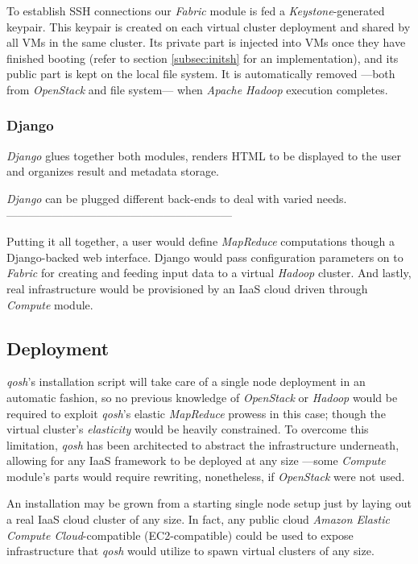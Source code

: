 \documentclass{sig-alternate}
\begin{document}
To establish SSH connections our \emph{Fabric} module is fed a \emph{Keystone}-generated keypair. This keypair is created on each virtual cluster deployment and shared by all VMs in the same cluster. Its private part is injected into VMs once they have finished booting (refer to section \ref{subsec:initsh} for an implementation), and its public part is kept on the local file system. It is automatically removed ---both from \emph{OpenStack} and file system--- when \emph{Apache Hadoop} execution completes.


\subsubsection{Django}
\noindent \emph{Django} glues together both modules, renders HTML to be displayed to the user and organizes result and metadata storage.

\emph{Django} can be plugged different back-ends to deal with varied needs. ------------------------------------------------------------

Putting it all together, a user would define \emph{MapReduce} computations though a Django-backed web interface. Django would pass configuration parameters on to \emph{Fabric} for creating and feeding input data to a virtual \emph{Hadoop} cluster. And lastly, real infrastructure would be provisioned by an IaaS cloud driven through \emph{Compute} module.


\subsection{Deployment}
\noindent \emph{qosh}'s installation script will take care of a single node deployment in an automatic fashion, so no previous knowledge of \emph{OpenStack} or \emph{Hadoop} would be required to exploit \emph{qosh}'s elastic \emph{MapReduce} prowess in this case; though the virtual cluster's \emph{elasticity} would be heavily constrained. To overcome this limitation, \emph{qosh} has been architected to abstract the infrastructure underneath, allowing for any IaaS framework to be deployed at any size ---some \emph{Compute} module's parts would require rewriting, nonetheless, if \emph{OpenStack} were not used.

An installation may be grown from a starting single node setup just by laying out a real IaaS cloud cluster of any size. In fact, any public cloud \emph{Amazon Elastic Compute Cloud}-compatible (EC2-compatible) could be used to expose infrastructure that \emph{qosh} would utilize to spawn virtual clusters of any size.
\end{document}

